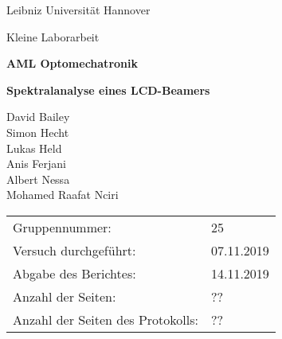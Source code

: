 \begin{titlepage}
	\centering
	{Leibniz Universität Hannover\par}
	{\large Kleine Laborarbeit\par}	

	\vspace{4.5cm}	
	
	{\huge \bf AML Optomechatronik \par}
	{\Huge \bf Spektralanalyse eines LCD-Beamers\par}
	\vspace{0.3cm}
	
	\vspace{1.5cm}
	
	{\Large David Bailey 	\\
			Simon Hecht		\\
			Lukas Held		\\
			Anis Ferjani	\\
			Albert Nessa	\\
			Mohamed Raafat Nciri \par}

	\vfill

	\raggedright

{\Large
\begin{tabular}{ll}
Gruppennummer:& 25 \\
Versuch durchgeführt:& 07.11.2019 \\
Abgabe des Berichtes:& 14.11.2019 \\
Anzahl der Seiten:& ?? \\
Anzahl der Seiten des Protokolls:& ??
\end{tabular}\par}

\end{titlepage}